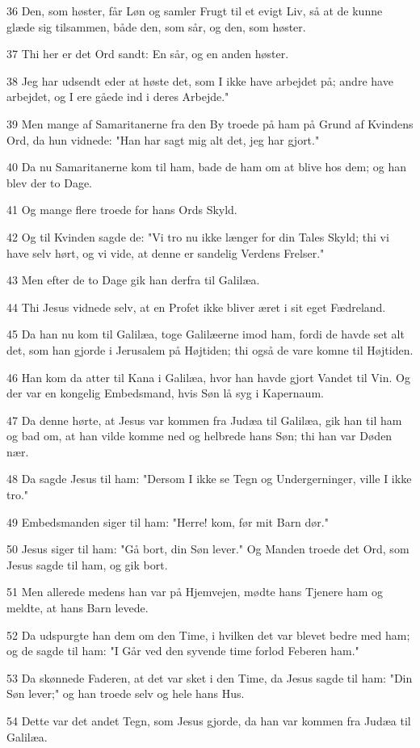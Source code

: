 \par 36 Den, som høster, får Løn og samler Frugt til et evigt Liv, så at de kunne glæde sig tilsammen, både den, som sår, og den, som høster.
\par 37 Thi her er det Ord sandt: En sår, og en anden høster.
\par 38 Jeg har udsendt eder at høste det, som I ikke have arbejdet på; andre have arbejdet, og I ere gåede ind i deres Arbejde."
\par 39 Men mange af Samaritanerne fra den By troede på ham på Grund af Kvindens Ord, da hun vidnede: "Han har sagt mig alt det, jeg har gjort."
\par 40 Da nu Samaritanerne kom til ham, bade de ham om at blive hos dem; og han blev der to Dage.
\par 41 Og mange flere troede for hans Ords Skyld.
\par 42 Og til Kvinden sagde de: "Vi tro nu ikke længer for din Tales Skyld; thi vi have selv hørt, og vi vide, at denne er sandelig Verdens Frelser."
\par 43 Men efter de to Dage gik han derfra til Galilæa.
\par 44 Thi Jesus vidnede selv, at en Profet ikke bliver æret i sit eget Fædreland.
\par 45 Da han nu kom til Galilæa, toge Galilæerne imod ham, fordi de havde set alt det, som han gjorde i Jerusalem på Højtiden; thi også de vare komne til Højtiden.
\par 46 Han kom da atter til Kana i Galilæa, hvor han havde gjort Vandet til Vin. Og der var en kongelig Embedsmand, hvis Søn lå syg i Kapernaum.
\par 47 Da denne hørte, at Jesus var kommen fra Judæa til Galilæa, gik han til ham og bad om, at han vilde komme ned og helbrede hans Søn; thi han var Døden nær.
\par 48 Da sagde Jesus til ham: "Dersom I ikke se Tegn og Undergerninger, ville I ikke tro."
\par 49 Embedsmanden siger til ham: "Herre! kom, før mit Barn dør."
\par 50 Jesus siger til ham: "Gå bort, din Søn lever." Og Manden troede det Ord, som Jesus sagde til ham, og gik bort.
\par 51 Men allerede medens han var på Hjemvejen, mødte hans Tjenere ham og meldte, at hans Barn levede.
\par 52 Da udspurgte han dem om den Time, i hvilken det var blevet bedre med ham; og de sagde til ham: "I Går ved den syvende time forlod Feberen ham."
\par 53 Da skønnede Faderen, at det var sket i den Time, da Jesus sagde til ham: "Din Søn lever;" og han troede selv og hele hans Hus.
\par 54 Dette var det andet Tegn, som Jesus gjorde, da han var kommen fra Judæa til Galilæa.

